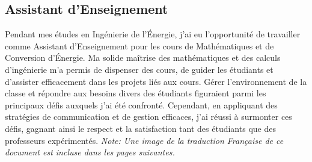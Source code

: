 \documentclass{article}
\begin{document}
    \subsection{Assistant d'Enseignement}

    Pendant mes études en Ingénierie de l'Énergie, j'ai eu l'opportunité de travailler comme Assistant d'Enseignement pour les cours de Mathématiques et de Conversion d'Énergie. Ma solide maîtrise des mathématiques et des calculs d'ingénierie m'a permis de dispenser des cours, de guider les étudiants et d'assister efficacement dans les projets liés aux cours. Gérer l'environnement de la classe et répondre aux besoins divers des étudiants figuraient parmi les principaux défis auxquels j'ai été confronté. Cependant, en appliquant des stratégies de communication et de gestion efficaces, j'ai réussi à surmonter ces défis, gagnant ainsi le respect et la satisfaction tant des étudiants que des professeurs expérimentés.
    \newline
    \newline
    \textit {Note: Une image de la traduction Française de ce document est incluse dans les pages suivantes.}
    \newline
    \newline

    \newpage
\end{document}
